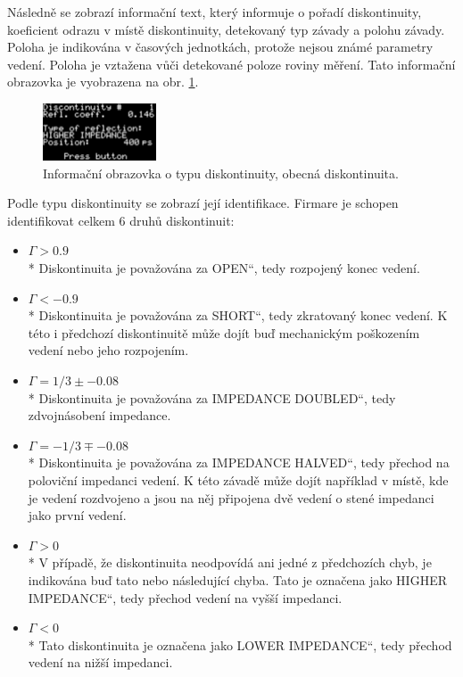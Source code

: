 Následně se zobrazí informační text, který informuje o pořadí diskontinuity, koeficient odrazu v místě diskontinuity, detekovaný typ závady a polohu závady. Poloha je indikována v časových jednotkách, protože nejsou známé parametry vedení. Poloha je vztažena vůči detekované poloze roviny měření. Tato informační obrazovka je vyobrazena na obr. \ref{discontinuity_split}.
\begin{figure}[H]
\includegraphics[width=0.3\textwidth,keepaspectratio,interpolate=false]{images/discontinuity_split.png}\caption{Informační obrazovka o typu diskontinuity, obecná diskontinuita.}\label{discontinuity_split}
\end{figure}

Podle typu diskontinuity se zobrazí její identifikace. Firmare je schopen identifikovat celkem 6 druhů diskontinuit:
\begin{itemize}
	\item{$\Gamma>\SI{0.9}{}$}\\* Diskontinuita je považována za \quotedblbase OPEN\textquotedblleft, tedy rozpojený konec vedení.
	\item{$\Gamma<\SI{-0.9}{}$}\\* Diskontinuita je považována za \quotedblbase SHORT\textquotedblleft, tedy zkratovaný konec vedení. K této i předchozí diskontinuitě může dojít buď mechanickým poškozením vedení nebo jeho rozpojením.
	\item{$\Gamma=1/3 \pm \SI{-0.08}{}$}\\* Diskontinuita je považována za \quotedblbase IMPEDANCE DOUBLED\textquotedblleft, tedy zdvojnásobení impedance.
	\item{$\Gamma=-1/3 \mp \SI{-0.08}{}$}\\* Diskontinuita je považována za \quotedblbase IMPEDANCE HALVED\textquotedblleft, tedy přechod na poloviční impedanci vedení. K této závadě může dojít například v místě, kde je vedení rozdvojeno a jsou na něj připojena dvě vedení o stené impedanci jako první vedení.
	\item{$\Gamma>\SI{0}{}$}\\* V případě, že diskontinuita neodpovídá ani jedné z předchozích chyb, je indikována buď tato nebo následující chyba. Tato je označena jako \quotedblbase HIGHER IMPEDANCE\textquotedblleft , tedy přechod vedení na vyšší impedanci.
	\item{$\Gamma<\SI{0}{}$}\\* Tato diskontinuita je označena jako \quotedblbase LOWER IMPEDANCE\textquotedblleft , tedy přechod vedení na nižší impedanci.
\end{itemize}

